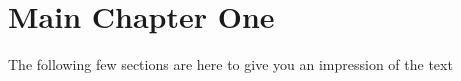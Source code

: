 \chapter{Main Chapter One}
	The following few sections are here to give you an impression of the text